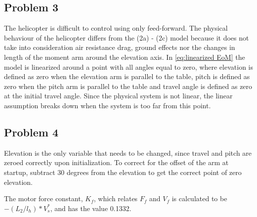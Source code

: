 \subsection{Problem 3}
The helicopter is difficult to control using only feed-forward. The
physical behaviour of the helicopter differs from the (2a) - (2c)
\cite[p.13]{assignment} model because it does not take into
consideration air resistance drag, ground effects nor the changes in
length of the moment arm around the elevation axis. In
\cref{eq:linearized EoM} the model is linearized around a point with
all
angles equal to zero, where elevation is defined as zero when the
elevation arm is parallel to the table, pitch is defined as zero when
the pitch arm is parallel to the table and travel angle is defined as
zero at the initial travel angle. Since the physical system is not
linear, the linear assumption breaks down when the system is too far
from this point.

\subsection{Problem 4}
Elevation is the only variable that needs to be changed, since travel
and pitch are zeroed correctly upon initialization. To correct for the
offset of the arm at startup, subtract 30 degrees from the elevation
to get the correct point of zero elevation.


The motor force constant, $K_f$, which relates $F_f$ and $V_f$ is
calculated to be $-(L_2/l_h)*V^*_s$, and has the value 0.1332.


